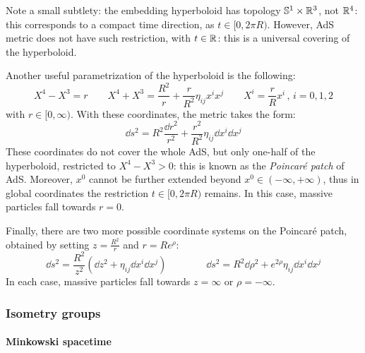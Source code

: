Note a small subtlety: the embedding hyperboloid has topology $ \mathbb{S}^{1} \times \mathbb{R}^3 $, not $ \mathbb{R}^4 $: this corresponds to a compact time direction, as $ t \in [0, 2\pi R) $. However, AdS metric does not have such restriction, with $ t \in \mathbb{R} $: this is a universal covering of the hyperboloid.

Another useful parametrization of the hyperboloid is the following:
\begin{equation*}
  X^4 - X^3 = r
  \qquad
  X^4 + X^3 = \frac{R^2}{r} + \frac{r}{R^2} \eta_{ij} x^i x^j
  \qquad
  X^i = \frac{r}{R} x^i
  \,,\, i = 0,1,2
\end{equation*}
with $ r \in [0, \infty) $. With these coordinates, the metric takes the form:
\begin{equation*}
  \dd s^2 = R^2 \frac{\dd r^2}{r^2} + \frac{r^2}{R^2} \eta_{ij} \dd x^i \dd x^j
\end{equation*}
These coordinates do not cover the whole AdS, but only one-half of the hyperboloid, restricted to $ X^4 - X^3 > 0 $: this is known as the \textit{Poincaré patch} of AdS. Moreover, $ x^0 $ cannot be further extended beyond $ x^0 \in (-\infty, +\infty) $, thus in global coordinates the restriction $ t \in [0,2\pi R) $ remains. In this case, massive particles fall towards $ r = 0 $.

Finally, there are two more possible coordinate systems on the Poincaré patch, obtained by setting $ z = \frac{R^2}{r} $ and $ r = R e^\rho $:
\begin{equation*}
  \dd s^2 = \frac{R^2}{z^2} \left( \dd z^2 + \eta_{ij} \dd x^i \dd x^j \right)
  \qquad \qquad
  \dd s^2 = R^2 \dd \rho^2 + e^{2\rho} \eta_{ij} \dd x^i \dd x^j
\end{equation*}
In each case, massive particles fall towards $ z = \infty $ or $ \rho = -\infty $.

\subsubsection{Isometry groups}

\paragraph{Minkowski spacetime}

